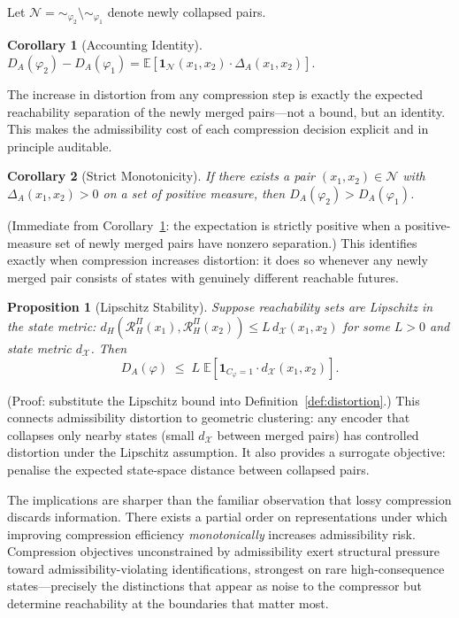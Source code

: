 \documentclass[10pt,twocolumn]{article}
\theoremstyle{plain}
\newtheorem{proposition}{Proposition}
\newtheorem{corollary}{Corollary}
\theoremstyle{definition}
\theoremstyle{remark}
\newcommand{\RHP}{\mathcal{R}_{H}^{\Pi}}
\newcommand{\DA}{D_{A}(\varphi)}
\newcommand{\calX}{\mathcal{X}}
\begin{document}
Let $\mathcal{N}={\sim_{\varphi_2}}\setminus{\sim_{\varphi_1}}$ denote newly
collapsed pairs.

\begin{corollary}[Accounting Identity]
\label{cor:accounting}
$D_A(\varphi_2) - D_A(\varphi_1) = \mathbb{E}[\mathbf{1}_{\mathcal{N}}(x_1,x_2)
\cdot \Delta_A(x_1,x_2)].$
\end{corollary}

The increase in distortion from any compression step is exactly the expected
reachability separation of the newly merged pairs---not a bound, but an identity.
This makes the admissibility cost of each compression decision explicit and in
principle auditable.

\begin{corollary}[Strict Monotonicity]
\label{cor:strict}
If there exists a pair $(x_1,x_2)\in\mathcal{N}$ with $\Delta_A(x_1,x_2)>0$
on a set of positive measure, then $D_A(\varphi_2) > D_A(\varphi_1)$.
\end{corollary}

\noindent(Immediate from Corollary~\ref{cor:accounting}: the expectation is
strictly positive when a positive-measure set of newly merged pairs have nonzero
separation.) This identifies exactly when compression increases distortion: it
does so whenever any newly merged pair consists of states with genuinely different
reachable futures.

\begin{proposition}[Lipschitz Stability]
\label{prop:lipschitz}
Suppose reachability sets are Lipschitz in the state metric: $d_H(\RHP(x_1),
\RHP(x_2))\leq L\,d_\calX(x_1,x_2)$ for some $L>0$ and state metric $d_\calX$.
Then
\[
  \DA \;\leq\; L\;\mathbb{E}\!\left[
    \mathbf{1}_{C_\varphi=1}\cdot d_\calX(x_1,x_2)
  \right].
\]
\end{proposition}

\noindent(Proof: substitute the Lipschitz bound into Definition~\ref{def:distortion}.)
This connects admissibility distortion to geometric clustering: any encoder that
collapses only nearby states (small $d_\calX$ between merged pairs) has controlled
distortion under the Lipschitz assumption. It also provides a surrogate objective:
penalise the expected state-space distance between collapsed pairs.

The implications are sharper than the familiar observation that lossy compression
discards information. There exists a partial order on representations under which
improving compression efficiency \emph{monotonically} increases admissibility risk.
Compression objectives unconstrained by admissibility exert structural pressure
toward admissibility-violating identifications, strongest on rare high-consequence
states---precisely the distinctions that appear as noise to the compressor but
determine reachability at the boundaries that matter most.
\end{document}
